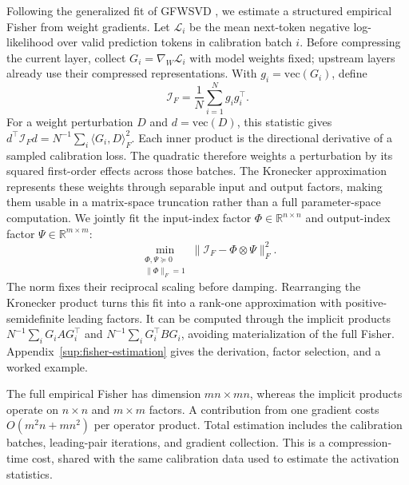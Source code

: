 \documentclass[11pt]{article}
\begin{document}
Following the generalized fit of GFWSVD \citep{chekalina2025gfwsvd}, we estimate a structured empirical Fisher from weight gradients. Let $\mathcal L_i$ be the mean next-token negative log-likelihood over valid prediction tokens in calibration batch $i$. Before compressing the current layer, collect $G_i=\nabla_W\mathcal L_i$ with model weights fixed; upstream layers already use their compressed representations. With $g_i=\mathrm{vec}(G_i)$, define
\begin{equation}
\mathcal I_F=\frac1N\sum_{i=1}^N g_i g_i^\top.
\label{eq:empirical-fisher}
\end{equation}
For a weight perturbation $D$ and $d=\mathrm{vec}(D)$, this statistic gives $d^\top\mathcal I_Fd=N^{-1}\sum_i\langle G_i,D\rangle_F^2$. Each inner product is the directional derivative of a sampled calibration loss. The quadratic therefore weights a perturbation by its squared first-order effects across those batches. The Kronecker approximation represents these weights through separable input and output factors, making them usable in a matrix-space truncation rather than a full parameter-space computation.
We jointly fit the input-index factor $\Phi\in\mathbb R^{n\times n}$ and output-index factor $\Psi\in\mathbb R^{m\times m}$:
\begin{equation}
\min_{\substack{\Phi,\Psi\succeq0\\\|\Phi\|_F=1}}
\|\mathcal I_F-\Phi\otimes\Psi\|_F^2.
\label{eq:fisher-kron-fit}
\end{equation}
The norm fixes their reciprocal scaling before damping. Rearranging the Kronecker product turns this fit into a rank-one approximation with positive-semidefinite leading factors. It can be computed through the implicit products $N^{-1}\sum_iG_iAG_i^\top$ and $N^{-1}\sum_iG_i^\top BG_i$, avoiding materialization of the full Fisher. Appendix~\ref{sup:fisher-estimation} gives the derivation, factor selection, and a worked example.

The full empirical Fisher has dimension $mn\times mn$, whereas the implicit products operate on $n\times n$ and $m\times m$ factors. A contribution from one gradient costs $O(m^2n+mn^2)$ per operator product. Total estimation includes the calibration batches, leading-pair iterations, and gradient collection. This is a compression-time cost, shared with the same calibration data used to estimate the activation statistics.
\end{document}
